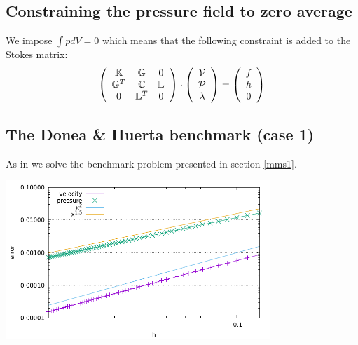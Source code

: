 


\subsection*{Constraining the pressure field to zero average}

We impose $\int p dV=0$ which means that the following constraint is added 
to the Stokes matrix:
\[
\left(
\begin{array}{ccc}
{\mathbb{K}} & {\mathbb{G}} & 0\\ 
{\mathbb{G}}^T & {\mathbb{C}} & {\mathbb{L}} \\
0 & {\mathbb{L}}^T & 0 
\end{array}
\right)
\cdot
\left(
\begin{array}{c}
{\cal V} \\ {\cal P} \\ \lambda
\end{array}
\right)
=
\left(
\begin{array}{c}
 f \\ h \\ 0
\end{array}
\right)
\]




\subsection*{The Donea \& Huerta benchmark (case 1)}

As in \cite{dohu03} we solve the benchmark problem presented in section \ref{mms1}.

\begin{center}
\includegraphics[width=10cm]{python_codes/fieldstone_22/results/case1/errors.pdf}
\end{center}

